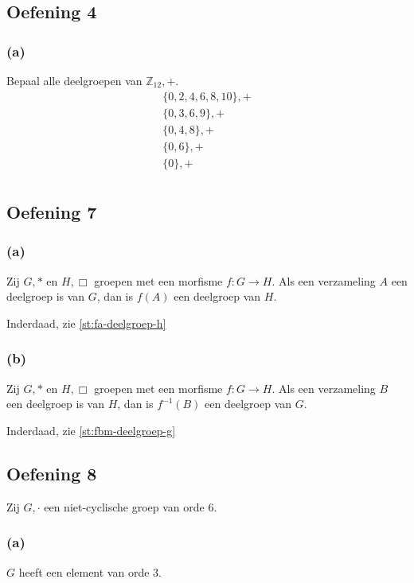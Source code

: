 \documentclass[main.tex]{subfiles}
\begin{document}


\subsection{Oefening 4}

\subsubsection{(a)}
Bepaal alle deelgroepen van $\mathbb{Z}_{12},+$.
\[
\begin{array}{c}
  \{ 0,2,4,6,8,10 \},+\\
  \{ 0,3,6,9 \},+\\
  \{ 0,4,8 \},+\\
  \{ 0,6 \},+\\
  \{ 0 \},+\\
\end{array}
\]





\subsection{Oefening 7}
\subsubsection{(a)}
Zij $G,*$ en $H,\Box$ groepen met een morfisme $f: G \rightarrow H$.
Als een verzameling $A$ een deelgroep is van $G$, dan is $f(A)$ een deelgroep van $H$.

Inderdaad, zie \ref{st:fa-deelgroep-h}
\subsubsection{(b)}
Zij $G,*$ en $H,\Box$ groepen met een morfisme $f: G \rightarrow H$.
Als een verzameling $B$ een deelgroep is van $H$, dan is $f^{-1}(B)$ een deelgroep van $G$.

Inderdaad, zie \ref{st:fbm-deelgroep-g}

\subsection{Oefening 8}
Zij $G,\cdot$ een niet-cyclische groep van orde $6$.

\subsubsection{(a)}
$G$ heeft een element van orde $3$.
\end{document}
